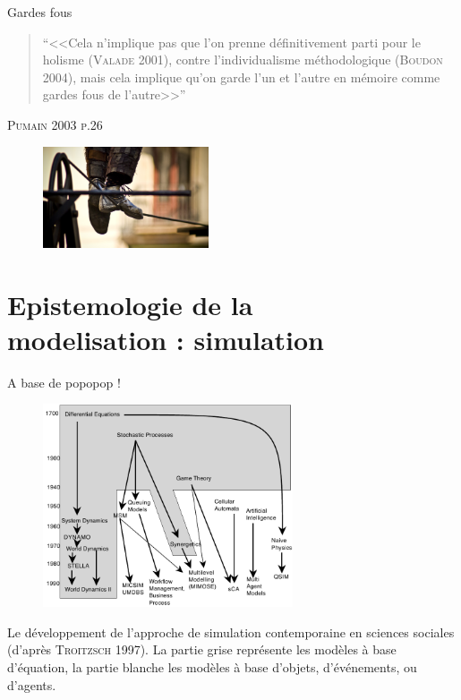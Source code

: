 \documentclass[newPxFont]{beamer}
\begin{document}
\begin{frame}[c]{Gardes fous}
\vspace{-1em}
\begin{quote}
  \enquote{<<Cela n'implique pas que l'on prenne définitivement parti pour le holisme (\textsc{Valade 2001}), contre l'individualisme méthodologique (\textsc{Boudon 2004}), mais cela implique qu'on garde l'un et l'autre en mémoire comme gardes fous de l'autre>>}
\end{quote}
\hspace*{\fill}\textsc{Pumain 2003 p.26}
\vspace{-0.5em}
\begin{figure}
 \includegraphics[height=3cm]{img/a_Funambule.jpg}
\end{figure}
\end{frame}

\section{Epistemologie de la\\ modelisation : simulation}

\begin{frame}[c]{A base de popopop !}
\vspace{-2em}
\begin{figure}
 \includegraphics[height=6cm]{img/a_troitzsch_1997.png}
\end{figure}
\vspace{-0.8em}
\small{Le développement de l'approche de simulation contemporaine en sciences sociales (d'après \textsc{Troitzsch} 1997). La partie grise représente les modèles à base d'équation, la partie blanche les modèles à base d'objets, d'événements, ou d'agents}.

\end{frame}
\end{document}
